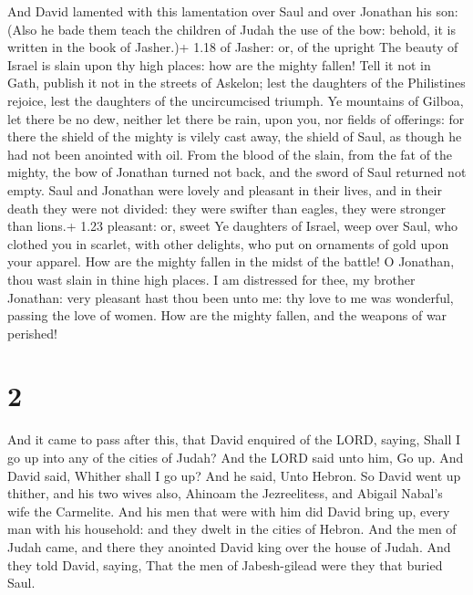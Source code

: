  And David lamented with this lamentation over Saul and
over Jonathan his son:  (Also he bade them teach the
children of Judah the use of the bow: behold, it is written in the book
of Jasher.)+ 1.18 of Jasher: or, of the upright  The beauty
of Israel is slain upon thy high places: how are the mighty fallen!
 Tell it not in Gath, publish it not in the streets of
Askelon; lest the daughters of the Philistines rejoice, lest the
daughters of the uncircumcised triumph.  Ye mountains of
Gilboa, let there be no dew, neither let there be rain, upon you, nor
fields of offerings: for there the shield of the mighty is vilely cast
away, the shield of Saul, as though he had not been anointed with oil.
 From the blood of the slain, from the fat of the mighty,
the bow of Jonathan turned not back, and the sword of Saul returned not
empty.  Saul and Jonathan were lovely and pleasant in their
lives, and in their death they were not divided: they were swifter than
eagles, they were stronger than lions.+ 1.23 pleasant: or, sweet
 Ye daughters of Israel, weep over Saul, who clothed you in
scarlet, with other delights, who put on ornaments of gold upon your
apparel.  How are the mighty fallen in the midst of the
battle! O Jonathan, thou wast slain in thine high places. 
I am distressed for thee, my brother Jonathan: very pleasant hast thou
been unto me: thy love to me was wonderful, passing the love of women.
 How are the mighty fallen, and the weapons of war
perished!

\hypertarget{section-1}{%
\section{2}\label{section-1}}

 And it came to pass after this, that David enquired of the
LORD, saying, Shall I go up into any of the cities of Judah? And the
LORD said unto him, Go up. And David said, Whither shall I go up? And he
said, Unto Hebron.  So David went up thither, and his two
wives also, Ahinoam the Jezreelitess, and Abigail Nabal's wife the
Carmelite.  And his men that were with him did David bring
up, every man with his household: and they dwelt in the cities of
Hebron.  And the men of Judah came, and there they anointed
David king over the house of Judah. And they told David, saying, That
the men of Jabesh-gilead were they that buried Saul.

